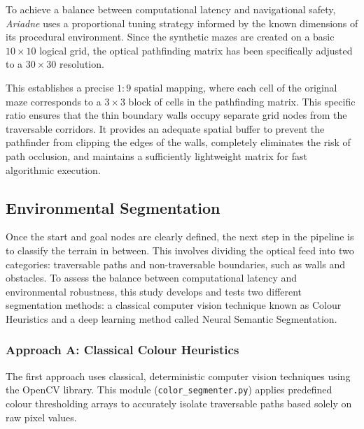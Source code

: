 \documentclass[12pt, a4paper]{article}
\begin{document}
\vspace{0.5cm}

To achieve a balance between computational latency and navigational safety, \textit{Ariadne} uses a proportional tuning strategy informed by the known dimensions of its procedural environment. Since the synthetic mazes are created on a basic $10\times10$ logical grid, the optical pathfinding matrix has been specifically adjusted to a $30\times30$ resolution.

\vspace{0.5cm}

This establishes a precise $1:9$ spatial mapping, where each cell of the original maze corresponds to a $3\times3$ block of cells in the pathfinding matrix. This specific ratio ensures that the thin boundary walls occupy separate grid nodes from the traversable corridors. It provides an adequate spatial buffer to prevent the pathfinder from clipping the edges of the walls, completely eliminates the risk of path occlusion, and maintains a sufficiently lightweight matrix for fast algorithmic execution.

\vspace{0.5cm}

\subsection{Environmental Segmentation}

\quad Once the start and goal nodes are clearly defined, the next step in the pipeline is to classify the terrain in between. This involves dividing the optical feed into two categories: traversable paths and non-traversable boundaries, such as walls and obstacles. To assess the balance between computational latency and environmental robustness, this study develops and tests two different segmentation methods: a classical computer vision technique known as Colour Heuristics and a deep learning method called Neural Semantic Segmentation.

\vspace{0.5cm}

\subsubsection{Approach A: Classical Colour Heuristics}

\quad The first approach uses classical, deterministic computer vision techniques using the OpenCV library. This module (\texttt{color\_segmenter.py}) applies predefined colour thresholding arrays to accurately isolate traversable paths based solely on raw pixel values.
\end{document}
